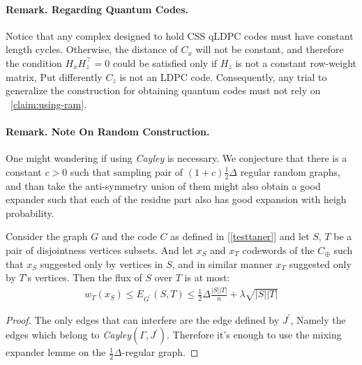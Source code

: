 \paragraph{Remark. Regarding Quantum Codes.} Notice that any complex designed to hold CSS qLDPC codes must have constant length cycles. Otherwise, the distance of $C_{x}$ will not be constant, and therefore the condition $H_{x}H_{z}^{\top} =0$ could be satisfied only if $H_{z}$ is not a constant row-weight matrix, Put differently $C_{z}$ is not an LDPC code. Consequently, any trial to generalize the construction for obtaining quantum codes must not rely on ~\cref{claim:using-ram}.    

\paragraph{Remark. Note On Random Construction.} One might wondering if using \emph{Cayley} is necessary. We conjecture that there is a constant $c > 0$ such that sampling pair of  $\left( 1 + c \right)\frac{1}{2}\Delta$ regular random graphs, and than take the anti-symmetry union of them might also obtain a good expander such that each of the residue part also has good expansion with heigh probability.  
\begin{claim} Consider the graph $G$ and the code $C$ as defined in [\ref{testtaner}] and let $S$, $T$ be a pair of disjointness vertices subsets. And let $x_{S}$ and $x_{T}$ codewords of the $C_{\oplus}$ such that $x_{S}$ suggested only by vertices in $S$, and in similar manner $x_{T}$ suggested only by $T$'s vertices. Then the flux of $S$ over $T$ is at most: 
  \begin{equation*}
    \begin{split}
      w_{T}\left( x_{S} \right) \le  E_{G^{\prime}}(S,T) \le \frac{1}{2} \Delta\frac{|S||T|}{n} + \lambda\sqrt{|S||T|} 
    \end{split}
  \end{equation*} 
\end{claim}
\begin{proof} The only edges that can interfere are the edge defined by $J^{\prime}$, Namely the edges which belong to \emph{Cayley}$\left( \Gamma, J^{\prime} \right)$. Therefore it's enough to use the mixing expander lemme on the $\frac{1}{2}\Delta$-regular graph. \end{proof}


